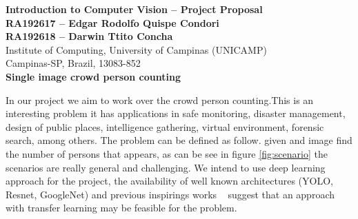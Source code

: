 \documentclass[10pt, a4paper]{article}
\begin{document}
\begin{center}

\textbf{Introduction to Computer Vision -- Project Proposal} \\[0.1cm]

\textbf{RA192617 -- Edgar Rodolfo Quispe Condori} \\[0.1cm]
\textbf{RA192618 -- Darwin Ttito Concha} \\[0.1cm]

Institute of Computing, University of Campinas (UNICAMP) \\
Campinas-SP, Brazil, 13083-852 \\

\vspace{0.5cm}
\textbf{\large{Single image crowd person counting}}
\end{center}

In our project we aim to work over the crowd person counting.This is an interesting problem it has applications in safe monitoring, disaster management, design of public places, intelligence gathering, virtual environment, forensic search, among others. The problem can be defined as follow. given and image find the number of persons that appears, as can be see in figure \ref{fig:scenario} the scenarios are really general  and challenging. We intend to use deep learning approach  for the project, the availability of well known architectures (YOLO, Resnet, GoogleNet) and previous inspirings works ~\cite{wang2015deep}\cite{zhang2016single}\cite{shang2016end} suggest that an approach with transfer learning may be feasible for the problem.
\end{document}
